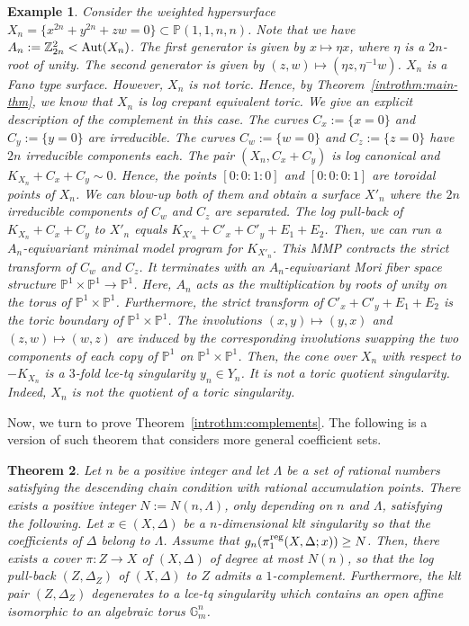 \documentclass{amsart}
\newcommand{\pp}{\mathbb{P}}
\newcommand{\zz}{\mathbb{Z}}
\newtheorem{theorem}{Theorem}[section]
\newtheorem{example}[theorem]{Example}
\theoremstyle{remark}
\numberwithin{equation}{section}
\begin{document}
\begin{example}\label{example}
{\em 
Consider the weighted hypersurface
$X_n=\{x^{2n}+y^{2n}+zw=0\} \subset
\pp(1,1,n,n)$.
Note that we have 
$A_n:=\zz_{2n}^2< {\rm Aut}(X_n)$.
The first generator is given by 
$x\mapsto \eta x$, where $\eta$ is a $2n$-root of unity.
The second generator is given by
$(z,w)\mapsto (\eta z, \eta^{-1}w)$.
$X_n$ is a Fano type surface.
However, $X_n$ is not toric.
Hence, by Theorem~\ref{introthm:main-thm}, we know that $X_n$ is log crepant equivalent  toric.
We give an explicit description of the complement in this case.
The curves $C_x:=\{x=0\}$
and $C_y:=\{y=0\}$ are irreducible.
The curves $C_w:=\{w=0\}$ and
$C_z:=\{z=0\}$ have $2n$ irreducible components each.
The pair $(X_n,C_x+C_y)$ is log canonical
and $K_{X_n}+C_x+C_y\sim 0$.
Hence, the points $[0:0:1:0]$
and $[0:0:0:1]$ are toroidal points of $X_n$.
We can blow-up both of them and obtain a surface $X'_n$ where the $2n$ irreducible components of $C_w$ and $C_z$ are separated.
The log pull-back of $K_{X_n}+C_x+C_y$ to $X'_n$ equals
$K_{X'_n}+C'_x+C'_y+E_1+E_2$.
Then, we can run a $A_n$-equivariant minimal model program for $K_{X'_n}$.
This MMP contracts the strict transform of 
$C_w$ and $C_z$.
It terminates
with an $A_n$-equivariant Mori fiber space structure
$\pp^1\times\pp^1 \rightarrow \pp^1$.
Here, $A_n$ acts as the multiplication by roots of unity on the torus of $\pp^1\times\pp^1$.
Furthermore, the strict transform of $C'_x+C'_y+E_1+E_2$ is the toric boundary
of $\pp^1\times \pp^1$.
The involutions $(x,y)\mapsto (y,x)$ and
$(z,w)\mapsto (w,z)$ are induced by the corresponding involutions swapping the two components of each copy of $\pp^1$ on $\pp^1\times\pp^1$.
Then, the cone over $X_n$ with respect to $-K_{X_n}$ is a $3$-fold lce-tq singularity 
$y_n\in Y_n$. It is not a toric quotient singularity. Indeed, $X_n$ is not the quotient of a toric singularity.
}
\end{example}

Now, we turn to prove Theorem~\ref{introthm:complements}.
The following is a version of such theorem
that considers more general coefficient sets.

\begin{theorem}
Let $n$ be a positive integer and let $\Lambda$ be a set of rational numbers satisfying the descending chain condition
with rational accumulation points.
There exists a positive integer $N:=N(n,\Lambda)$, only depending on $n$ and $\Lambda$, satisfying the following.
Let $x\in (X,\Delta)$ be a $n$-dimensional klt singularity so that the coefficients of $\Delta$ belong to $\Lambda$.
Assume that $g_n(\pi_1^{\rm reg}(X,\Delta;x))\geq N$.
Then, there exists a cover $\pi\colon Z\rightarrow X$ of 
$(X,\Delta)$ of degree at most $N(n)$, so that the log pull-back $(Z,\Delta_Z)$
of $(X,\Delta)$ to $Z$
admits a $1$-complement.
Furthermore, the klt pair $(Z,\Delta_Z)$ degenerates to a 
lce-tq singularity which contains an open affine isomorphic to an algebraic torus $\mathbb{G}_m^n$.
\end{theorem}
\end{document}
